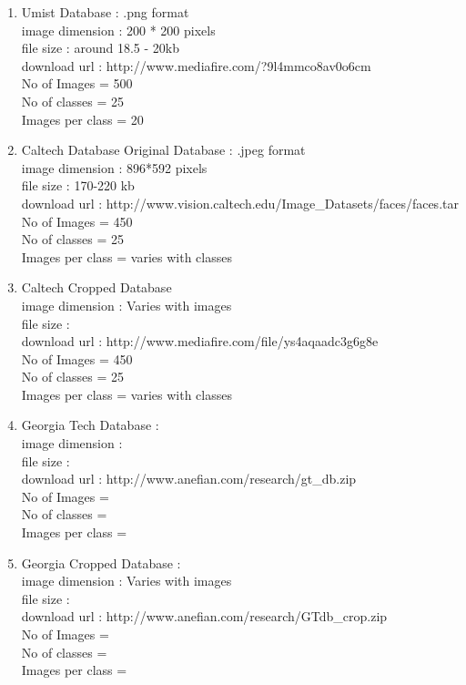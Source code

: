 \documentclass[10pt,a4paper]{article}
\begin{document}
\begin{enumerate}
\item Umist Database : .png format \\
   image dimension : 200 * 200 pixels \\
   file size : around 18.5 - 20kb \\
   download url : http://www.mediafire.com/?9l4mmco8av0o6cm \\
   No of Images = 500 \\
   No of classes = 25 \\
   Images per class = 20 \\ 

\item Caltech Database Original Database : .jpeg format \\
   image dimension : 896*592 pixels \\
   file size : 170-220 kb \\
   download url : http://www.vision.caltech.edu/Image\_Datasets/faces/faces.tar  \\
   No of Images = 450 \\
   No of classes = 25 \\
   Images per class = varies with classes \\

\item Caltech Cropped Database \\
   image dimension :  Varies with images \\
   file size : \\
   download url : http://www.mediafire.com/file/ys4aqaadc3g6g8e \\
   No of Images = 450 \\
   No of classes = 25 \\
   Images per class = varies with classes \\

\item Georgia Tech Database : \\
   image dimension :  \\
   file size : \\ 
   download url : http://www.anefian.com/research/gt\_db.zip \\
   No of Images =  \\
   No of classes =  \\
   Images per class =  \\ 

\item Georgia Cropped Database : \\
   image dimension :  Varies with images \\
   file size : \\
   download url : http://www.anefian.com/research/GTdb\_crop.zip \\
   No of Images = \\
   No of classes =  \\
   Images per class = \\


\end{enumerate}
\end{document}
